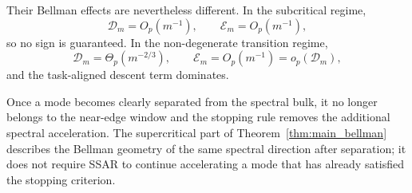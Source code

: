Their Bellman effects are nevertheless different. In the subcritical
regime,
\begin{equation}
\mathcal D_m=O_p(m^{-1}),
\qquad
\mathcal E_m=O_p(m^{-1}),
\end{equation}
so no sign is guaranteed. In the non-degenerate transition regime,
\begin{equation}
\mathcal D_m=\Theta_p(m^{-2/3}),
\qquad
\mathcal E_m=O_p(m^{-1})
=
o_p(\mathcal D_m),
\end{equation}
and the task-aligned descent term dominates.

Once a mode becomes clearly separated from the spectral bulk, it no longer
belongs to the near-edge window and the stopping rule removes the additional
spectral acceleration. The supercritical part of
Theorem~\ref{thm:main_bellman} describes the Bellman geometry of the same
spectral direction after separation; it does not require SSAR to continue
accelerating a mode that has already satisfied the stopping criterion.





